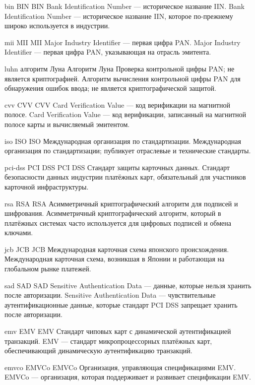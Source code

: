 \DeclareTerm
{bin}
{BIN}
{BIN}
{Bank Identification Number — историческое название IIN.}
{Bank Identification Number — историческое название IIN, которое по-прежнему широко используется в индустрии.}

\DeclareTerm
{mii}
{MII}
{MII}
{Major Industry Identifier — первая цифра PAN.}
{Major Industry Identifier — первая цифра PAN, указывающая на отрасль эмитента.}

\DeclareTerm
{luhn}
{алгоритм Луна}
{Алгоритм Луна}
{Проверка контрольной цифры PAN; не является криптографией.}
{Алгоритм вычисления контрольной цифры PAN для обнаружения ошибок ввода; не является криптографической защитой.}

\DeclareTerm
{cvv}
{CVV}
{CVV}
{Card Verification Value — код верификации на магнитной полосе.}
{Card Verification Value — код верификации, записанный на магнитной полосе карты и вычисляемый эмитентом.}

\DeclareTerm
{iso}
{ISO}
{ISO}
{Международная организация по стандартизации.}
{Международная организация по стандартизации; публикует отраслевые и технические стандарты.}

\DeclareTerm
{pci-dss}
{PCI DSS}
{PCI DSS}
{Стандарт защиты карточных данных.}
{Стандарт безопасности данных индустрии платёжных карт, обязательный для участников карточной инфраструктуры.}

\DeclareTerm
{rsa}
{RSA}
{RSA}
{Асимметричный криптографический алгоритм для подписей и шифрования.}
{Асимметричный криптографический алгоритм, который в платёжных системах часто используется для цифровых подписей и обмена ключами.}

\DeclareTerm
{jcb}
{JCB}
{JCB}
{Международная карточная схема японского происхождения.}
{Международная карточная схема, возникшая в Японии и работающая на глобальном рынке платежей.}

\DeclareTerm
{sad}
{SAD}
{SAD}
{Sensitive Authentication Data — данные, которые нельзя хранить после авторизации.}
{Sensitive Authentication Data — чувствительные аутентификационные данные, которые стандарт PCI DSS запрещает хранить после авторизации.}

\DeclareTerm
{emv}
{EMV}
{EMV}
{Стандарт чиповых карт с динамической аутентификацией транзакций.}
{EMV — стандарт микропроцессорных платёжных карт, обеспечивающий динамическую аутентификацию транзакций.}

\DeclareTerm
{emvco}
{EMVCo}
{EMVCo}
{Организация, управляющая спецификациями EMV.}
{EMVCo — организация, которая поддерживает и развивает спецификации EMV.}

